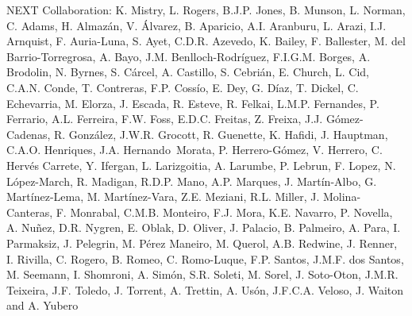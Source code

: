 NEXT Collaboration: K. Mistry, L. Rogers, B.J.P. Jones, B. Munson, L. Norman, C. Adams, H. Almaz\'an, V. \'Alvarez, B. Aparicio, A.I. Aranburu, L. Arazi, I.J. Arnquist, F. Auria-Luna, S. Ayet, C.D.R. Azevedo, K. Bailey, F. Ballester, M. del Barrio-Torregrosa, A. Bayo, J.M. Benlloch-Rodr\'{i}guez, F.I.G.M. Borges, A. Brodolin, N. Byrnes, S. C\'arcel, A. Castillo, S. Cebri\'an, E. Church, L. Cid, C.A.N. Conde, T. Contreras, F.P. Coss\'io, E. Dey, G. D\'iaz, T. Dickel, C. Echevarria, M. Elorza, J. Escada, R. Esteve, R. Felkai, L.M.P. Fernandes, P. Ferrario, A.L. Ferreira, F.W. Foss, E.D.C. Freitas, Z. Freixa, J.J. G\'omez-Cadenas, R. Gonz\'alez, J.W.R. Grocott, R. Guenette, K. Hafidi, J. Hauptman, C.A.O. Henriques, J.A. Hernando~Morata, P. Herrero-G\'omez, V. Herrero, C. Herv\'es Carrete, Y. Ifergan, L. Larizgoitia, A. Larumbe, P. Lebrun, F. Lopez, N. L\'opez-March, R. Madigan, R.D.P. Mano, A.P. Marques, J. Mart\'in-Albo, G. Mart\'inez-Lema, M. Mart\'inez-Vara, Z.E. Meziani, R.L. Miller, J. Molina-Canteras, F. Monrabal, C.M.B. Monteiro, F.J. Mora, K.E. Navarro, P. Novella, A. Nu\~{n}ez, D.R. Nygren, E. Oblak, D. Oliver, J. Palacio, B. Palmeiro, A. Para, I. Parmaksiz, J. Pelegrin, M. P\'erez Maneiro, M. Querol, A.B. Redwine, J. Renner, I. Rivilla, C. Rogero, B. Romeo, C. Romo-Luque, F.P. Santos, J.M.F. dos Santos, M. Seemann, I. Shomroni, A. Sim\'on, S.R. Soleti, M. Sorel, J. Soto-Oton, J.M.R. Teixeira, J.F. Toledo, J. Torrent, A. Trettin, A. Us\'on, J.F.C.A. Veloso, J. Waiton and A. Yubero